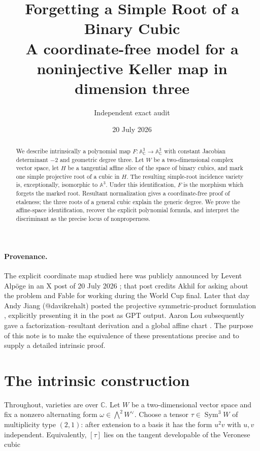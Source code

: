 \documentclass[11pt,a4paper]{article}
\title{\color{paperblue}\bfseries
  Forgetting a Simple Root of a Binary Cubic\\[2mm]
  \large A coordinate-free model for a noninjective Keller map in dimension three}
\author{Independent exact audit}
\date{20 July 2026}
\theoremstyle{remark}
\DeclareMathOperator{\Sym}{Sym}
\newcommand{\A}{\mathbb A}
\newcommand{\C}{\mathbb C}
\begin{document}
\maketitle

\begin{abstract}
We describe intrinsically a polynomial map
$F\colon\A^3_{\C}\to\A^3_{\C}$ with constant Jacobian determinant
$-2$ and geometric degree three.  Let $W$ be a two-dimensional complex
vector space, let $H$ be a tangential affine slice of the space of binary
cubics, and mark one simple projective root of a cubic in $H$.  The resulting
simple-root incidence variety is, exceptionally, isomorphic to $\A^3$.
Under this identification, $F$ is the morphism which forgets the marked
root.  Resultant normalization gives a coordinate-free proof of etaleness;
the three roots of a general cubic explain the generic degree.  We prove the
affine-space identification, recover the explicit polynomial formula, and
interpret the discriminant as the precise locus of nonproperness.
\end{abstract}

\paragraph{Provenance.}
The explicit coordinate map studied here was publicly announced by Levent
Alp\"oge in an X post of 20 July 2026 \cite{Alpoge}; that post credits Akhil
for asking about the problem and Fable for working during the World Cup final.
Later that day Andy Jiang (@davikrehalt) posted the projective symmetric-product
formulation \cite{Jiang}, explicitly presenting it in the post as GPT output.
Aaron Lou subsequently gave a factorization--resultant derivation and a global
affine chart \cite{Lou}.  The purpose of this note is to make the equivalence
of these presentations precise and to supply a detailed intrinsic proof.

\section{The intrinsic construction}

Throughout, varieties are over $\C$.  Let $W$ be a two-dimensional vector
space and fix a nonzero alternating form
$\omega\in\bigwedge^2W^\vee$.  Choose a tensor
$\tau\in\Sym^3W$ of multiplicity type $(2,1)$: after extension to a basis it
has the form $u^2v$ with $u,v$ independent.  Equivalently, $[\tau]$ lies on
the tangent developable of the Veronese cubic
\end{document}
